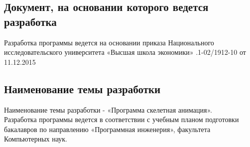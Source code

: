 \subsection{Документ, на основании которого ведется разработка}
Разработка программы ведется на основании приказа Национального исследовательского университета «Высшая школа экономики» .1-02/1912-10 от 11.12.2015


\subsection{Наименование темы разработки}
Наименование темы разработки - «Программа скелетная анимация». \\
Разработка программы ведется в соответствии с учебным планом подготовки бакалавров по направлению «Программная инженерия», факультета Компьютерных наук.